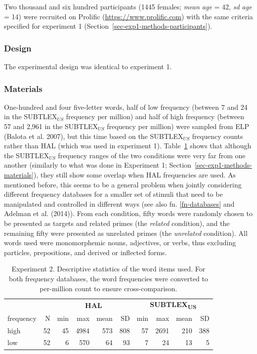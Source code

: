 \documentclass[
]{interact}
\begin{document}
Two thousand and six hundred participants (1445 females; \emph{mean age}
= 42, \emph{sd age} = 14) were recruited on Prolific
(\url{https://www.prolific.com}) with the same criteria specified for
experiment 1 (Section~\ref{sec-exp1-methods-participants}).

\subsubsection{Design}\label{sec-exp2-methods-design}

The experimental design was identical to experiment 1.

\subsubsection{Materials}\label{sec-exp2-methods-materials}

One-hundred and four five-letter words, half of low frequency (between 7
and 24 in the SUBTLEX\(_{US}\) frequency per million) and half of high
frequency (between 57 and 2,961 in the SUBTLEX\(_{US}\) frequency per
million) were sampled from ELP (Balota et al. 2007), but this time based
on the SUBTLEX\(_{US}\) frequency counts rather than HAL (which was used
in experiment 1). Table~\ref{tbl-words_exp2} shows that although the
SUBTLEX\(_{US}\) frequency ranges of the two conditions were very far
from one another (similarly to what was done in Experiment 1;
Section~\ref{sec-exp1-methods-materials}), they still show some overlap
when HAL frequencies are used. As mentioned before, this seems to be a
general problem when jointly considering different frequency databases
for a smaller set of stimuli that need to be manipulated and controlled
in different ways (see also fn. \ref{fn-databases} and Adelman et al.
(2014)). From each condition, fifty words were randomly chosen to be
presented as targets and related primes (the \emph{related} condition),
and the remaining fifty were presented as unrelated primes (the
\emph{unrelated} condition). All words used were monomorphemic nouns,
adjectives, or verbs, thus excluding particles, prepositions, and
derived or inflected forms.

\begin{longtable}{lrrrrrrrrr}

\caption{\label{tbl-words_exp2}Experiment 2. Descriptive statistics of
the word items used. For both frequency databases, the word frequencies
were converted to per-million count to ensure cross-comparison.}

\tabularnewline

\toprule
 &  & \multicolumn{4}{c}{\textbf{HAL}} & \multicolumn{4}{c}{\textbf{SUBTLEX\textsubscript{US}}} \\ 
\cmidrule(lr){3-6} \cmidrule(lr){7-10}
frequency & N & min & max & mean & SD & min & max & mean & SD \\ 
\midrule\addlinespace[2.5pt]
high & 52 & 45 & 4984 & 573 & 808 & 57 & 2691 & 210 & 388 \\ 
low & 52 & 6 & 570 & 64 & 93 & 7 & 24 & 13 & 5 \\ 
\bottomrule

\end{longtable}
\end{document}
